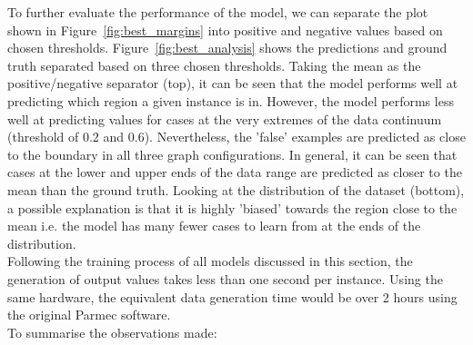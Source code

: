 \noindent
To further evaluate the performance of the model, we can separate the plot shown in Figure~\ref{fig:best_margins} into positive and negative values based on chosen thresholds. Figure~\ref{fig:best_analysis} shows the predictions and ground truth separated based on three chosen thresholds. Taking the mean as the positive/negative separator (top), it can be seen that the model performs well at predicting which region a given instance is in. However, the model performs less well at predicting values for cases at the very extremes of the data continuum (threshold of 0.2 and 0.6). Nevertheless, the 'false' examples are predicted as close to the boundary in all three graph configurations. In general, it can be seen that cases at the lower and upper ends of the data range are predicted as closer to the mean than the ground truth. Looking at the distribution of the dataset (bottom), a possible explanation is that it is highly 'biased' towards the region close to the mean i.e. the model has many fewer cases to learn from at the ends of the distribution.
\\

\noindent
Following the training process of all models discussed in this section, the generation of output values takes less than one second per instance. Using the same hardware, the equivalent data generation time would be over 2 hours using the original Parmec software.
\\

\noindent
To summarise the observations made:

